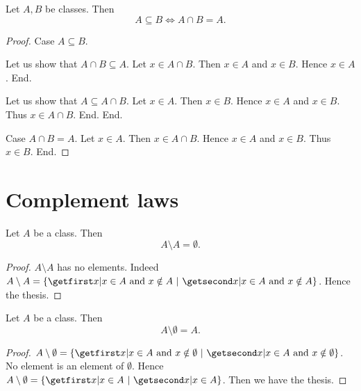 \documentclass[../../set-theory/set-theory.tex]{subfiles}
\begin{document}
  \begin{forthel}
    \begin{proposition}
      Let $A, B$ be classes.
      Then \[ A \subseteq B \iff A \cap B = A. \]
    \end{proposition}
    \begin{proof}
      Case $A \subseteq B$.

        Let us show that $A \cap B \subseteq A$.
          Let $x \in A \cap B$.
          Then $x \in A$ and $x \in B$.
          Hence $x \in A$.
        End.

        Let us show that $A \subseteq A \cap B$.
          Let $x \in A$.
          Then $x \in B$.
          Hence $x \in A$ and $x \in B$.
          Thus $x \in A \cap B$.
        End.
      End.

      Case $A \cap B = A$.
        Let $x \in A$.
        Then $x \in A \cap B$.
        Hence $x \in A$ and $x \in B$.
        Thus $x \in B$.
      End.
    \end{proof}
  \end{forthel}


  \section*{Complement laws}

  \begin{forthel}
    \begin{proposition}
      Let $A$ be a class.
      Then \[ A \setminus A = \emptyset. \]
    \end{proposition}
    \begin{proof}
      $A \setminus A$ has no elements.
      Indeed $A \setminus A = \class{ x | \text{$x \in A$ and $x \notin A$} }$.
      Hence the thesis.
    \end{proof}
  \end{forthel}

  \begin{forthel}
    \begin{proposition}
      Let $A$ be a class.
      Then \[ A \setminus \emptyset = A. \]
    \end{proposition}
    \begin{proof}
      $A \setminus \emptyset = \class{ x | \text{$x \in A$ and
      $x \notin \emptyset$} }$.
      No element is an element of $\emptyset$.
      Hence $A \setminus \emptyset = \class{ x | x \in A }$.
      Then we have the thesis.
    \end{proof}
  \end{forthel}
\end{document}
